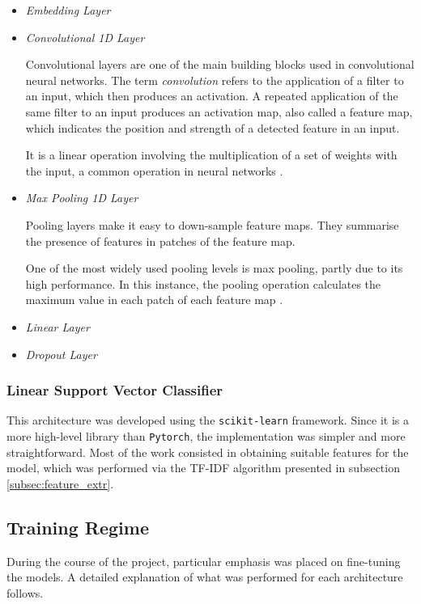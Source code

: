 \documentclass[letterpaper,11pt]{article}
\begin{document}
\begin{itemize}
  \item \textit{Embedding Layer}
  \item \textit{Convolutional 1D Layer}
  
  Convolutional layers are one of the main building blocks used in convolutional neural networks. The term \textit{convolution} refers to the application of a filter to an input, which then produces an activation. A repeated application of the same filter to an input produces an activation map, also called a feature map, which indicates the position and strength of a detected feature in an input.

  It is a linear operation involving the multiplication of a set of weights with the input, a common operation in neural networks \cite{CNN_how}.
  \item \textit{Max Pooling 1D Layer}
  
  Pooling layers make it easy to down-sample feature maps. They summarise the presence of features in patches of the feature map. 
  
  One of the most widely used pooling levels is max pooling, partly due to its high performance. In this instance, the pooling operation calculates the maximum value in each patch of each feature map \cite{MaxPool_how}.
  \item \textit{Linear Layer}
  \item \textit{Dropout Layer}
\end{itemize}





\subsubsection*{Linear Support Vector Classifier}

This architecture was developed using the \verb|scikit-learn| framework. Since it is a more high-level library than \verb|Pytorch|, the implementation was simpler and more straightforward. Most of the work consisted in obtaining suitable features for the model, which was performed via the TF-IDF algorithm presented in subsection \ref{subsec:feature_extr}.

\subsection{Training Regime}
\label{subsec:fine_tuning}

During the course of the project, particular emphasis was placed on fine-tuning the models. A detailed explanation of what was performed for each architecture follows.
\end{document}
